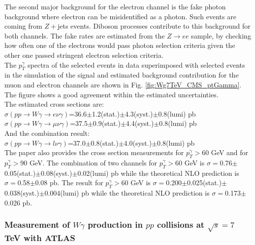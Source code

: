 The second major background for the electron channel is the fake photon background where electron can be misidentified as a photon. Such events are coming from $Z+$jets events. Diboson processes contribute to this background for both channels. The fake rates are estimated from the $Z\rightarrow ee$ sample, by checking how often one of the electrons would pass photon selection criteria given the other one passed stringent electron selection criteria.\\


The $p_T^\gamma$ spectra of the selected events in data superimposed with selected events in the simulation of the signal and estimated background contribution for the muon and electron channels are shown in Fig. \ref{fig:Wg7TeV_CMS_ptGamma}. The figure shows a good agreement within the estimated uncertainties.\\

The estimated cross sections are:\\
$\sigma(pp\rightarrow W\gamma \rightarrow e\nu\gamma)$=36.6$\pm$1.2(stat.)$\pm$4.3(syst.)$\pm$0.8(lumi) pb\\
$\sigma(pp\rightarrow W\gamma \rightarrow \mu\nu\gamma)$=37.5$\pm$0.9(stat.)$\pm$4.4(syst.)$\pm$0.8(lumi) pb\\
And the combination result:\\
$\sigma(pp\rightarrow W\gamma \rightarrow l\nu\gamma)$=37.0$\pm$0.8(stat.)$\pm$4.0(syst.)$\pm$0.8(lumi) pb\\

The paper also provides the cross section measurements for $p_T^\gamma>$60 GeV and for $p_T^\gamma>$90 GeV. The combination of two channels for $p_T^\gamma>$60 GeV is $\sigma=$0.76$\pm$0.05(stat.)$\pm$0.08(syst.)$\pm$0.02(lumi) pb while the theoretical NLO prediction is $\sigma=$0.58$\pm$0.08 pb. The result for $p_T^\gamma>$60 GeV is $\sigma=$0.200$\pm$0.025(stat.)$\pm$0.038(syst.)$\pm$0.004(lumi) pb while the theoretical NLO prediction is $\sigma=$0.173$\pm$0.026 pb.\\


\subsubsection{Measurement of $W\gamma$ production in $pp$ collisions at $\sqrt{s}=7$ TeV with ATLAS}

